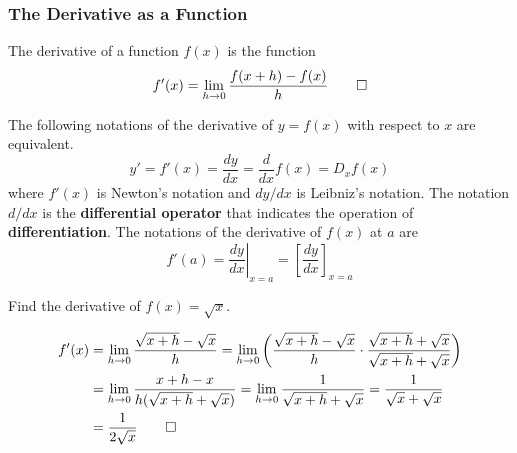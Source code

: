 \subsubsection{The Derivative as a Function}
\begin{definition}
    The derivative of a function \(f(x)\) is the function
    \[f'(x)=\lim_{h\to 0}\frac{f(x+h)-f(x)}{h}\qedhere\]
\end{definition}
The following notations of the derivative of \(y=f(x)\) with respect to \(x\) are
equivalent.
\[y'=f'(x)=\frac{dy}{dx}=\frac{d}{dx}f(x)=D_x f(x)\]
where \(f'(x)\) is Newton's notation and \(dy/dx\) is Leibniz's notation.
The notation \(d/dx\) is the \textbf{differential operator} that indicates the
operation of \textbf{differentiation}.
The notations of the derivative of \(f(x)\) at \(a\) are
\[f'(a)=\left.\frac{dy}{dx}\right|_{x=a}=\left[\frac{dy}{dx}\right]_{x=a}\]
\begin{problem}
    Find the derivative of \(f(x)=\sqrt{x}\).
\end{problem}
\begin{solution}
    \begin{align*}
        f'(x)&=\lim_{h\to 0}\frac{\sqrt{x+h}-\sqrt{x}}{h}=\lim_{h\to 0}
        \left(\frac{\sqrt{x+h}-\sqrt{x}}{h}\cdot
        \frac{\sqrt{x+h}+\sqrt{x}}{\sqrt{x+h}+\sqrt{x}}\right) \\
        &=\lim_{h\to 0}\frac{x+h-x}{h(\sqrt{x+h}+\sqrt{x})}
        =\lim_{h\to 0}\frac{1}{\sqrt{x+h}+\sqrt{x}}=\frac{1}{\sqrt{x}+\sqrt{x}} \\
        &= \frac{1}{2\sqrt{x}}\qedhere
    \end{align*}
\end{solution}


